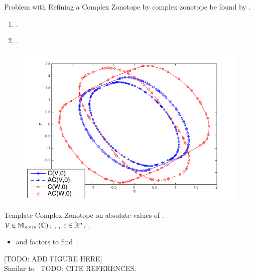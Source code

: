 \begin{frame}{Problem with Refining a Complex Zonotope}
\negemph{*}  by complex
zonotope  be found by .
%
\begin{enumerate}
\item {}.
\item {}.
\end{enumerate}
%
\begin{figure}
\center
\includegraphics[scale=0.3]{figures/CZtopes/refinement.png}
\end{figure}
%
\end{frame}
%
\begin{frame}{Template Complex Zonotope}
 on absolute values of .\\[0.5em]

{\small
${\mathcal{V}\in\mathbb{M}_{n\times m}\left(\mathbb{C}\right)}$: ,
,
${c\in\mathbb{R}^n}$: .
}
%
\begin{block}{}
%
\end{block}
%
\begin{itemize}
\item {} and  factors to find .
\end{itemize}
%
[TODO: ADD FIGURE HERE]\\
Similar to ~{TODO: CITE REFERENCES}.
\end{frame}
